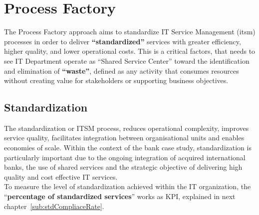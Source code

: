 \chapter{Process Factory}



The Process Factory approach aims to standardize IT Service Management (\gls{itsm}) processes in order to deliver \textbf{``standardized''} services with greater efficiency, higher quality, and lower operational costs. This is a critical factors, that needs to see IT Department operate as ``Shared Service Center'' toward the identification and elimination of \textbf{``waste''}, defined as any activity that consumes resources without creating value for stakeholders or supporting business objectives. 


\section{Standardization}
\label{subs:standardization}


The standardization or ITSM process, reduces operational complexity, improves service quality, facilitates integration between organisational units and enables economies of scale. Within the context of the bank case study, standardization is particularly important due to the ongoing integration of acquired international banks, the use of shared services and the strategic objective of delivering high quality and cost effective IT services. \\

To measure the level of standardization achieved within the IT organization, the ``\textbf{percentage of standardized services}'' works as KPI, explained in next chapter~\ref{sub:stdCompliaceRate}.


